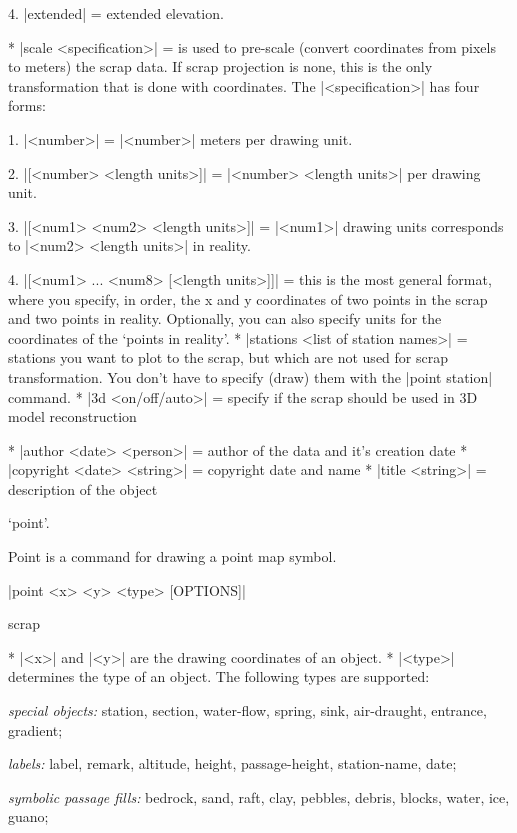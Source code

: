     4. |extended| = extended elevation.

  * |scale <specification>| = 
    is used to pre-scale (convert coordinates from pixels to 
    meters) the scrap data. If scrap projection is none, this is the only 
    transformation that is done with coordinates.  
    The |<specification>| has four forms:

    1. |<number>| = |<number>| meters per drawing unit.

    2. |[<number> <length units>]| = |<number> <length units>| per
       drawing unit.

    3. |[<num1> <num2> <length units>]| = |<num1>| drawing units 
       corresponds to |<num2> <length units>| in reality.

    4. |[<num1> ... <num8> [<length units>]]| = this is the most
       general format, where you specify, in order, the x and y coordinates
       of two points in the scrap and two points in reality.
       Optionally, you can also specify units for the coordinates of the `points in reality'.
  * |stations <list of station names>| = stations you want to plot
    to the scrap, but which are not used for scrap transformation. You don't have
    to specify (draw) them with the |point station| command.
  * |3d <on/off/auto>| = specify if the scrap should be used in 3D model 
    reconstruction

  * |author <date> <person>| = author of the data and it's creation date
  * |copyright <date> <string>| = copyright date and name
  * |title <string>| = description of the object
\endoptions




\subsubchapter `point'.

\description
Point is a command for drawing a point map symbol.
\enddescription

\syntax
  |point <x> <y> <type> [OPTIONS]|
\endsyntax

\context
  scrap
\endcontext

\arguments
  * |<x>| and |<y>| are the drawing coordinates of an object.
  * |<type>| determines the type of an object. The following
    types are supported: 

    {\it special objects:} station, section, water-flow, spring, sink,
    air-draught, entrance, gradient;

    {\it labels:} label, remark, altitude, height, passage-height, 
    station-name, date;

    {\it symbolic passage fills:} bedrock, sand, raft, clay, pebbles,
    debris, blocks, water, ice, guano;

